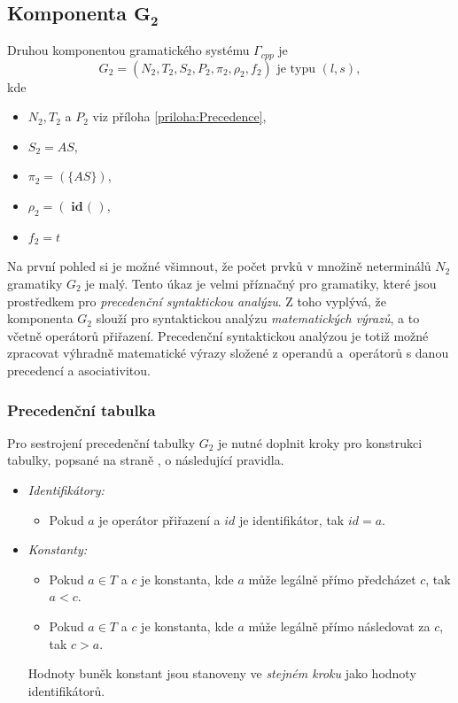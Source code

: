 \subsection*{Komponenta $\textbf{G}_\textbf{2}$}
Druhou komponentou gramatického systému $\Gamma_{cpp}$ je
$$G_2 = (N_2, T_2, S_2, P_2, \pi_2, \rho_2, f_2)\text{ je typu } (l, s),$$ kde
\begin{itemize}
  \item $N_2, T_2$ a $P_2$ viz příloha \ref{priloha:Precedence},
  \item $S_2 = AS$,
  \item $\pi_2 = (\{AS\})$,
  \item $\rho_2 = (\textbf{ id} \textbf{ ( })$,
  \item $f_2 = t$
\end{itemize}
Na první pohled si je možné všimnout, že počet prvků v množině neterminálů $N_2$ gramatiky $G_2$ je malý. Tento úkaz je velmi příznačný
pro gramatiky, které jsou prostředkem pro \emph{precedenční syntaktickou analýzu}. Z toho vyplývá, že komponenta $G_2$ slouží pro syntaktickou analýzu \emph{matematických výrazů}, a to
včetně operátorů přiřazení. Precedenční syntaktickou analýzou je totiž možné zpracovat výhradně matematické výrazy složené z operandů a~operátorů s danou precedencí a asociativitou.

\subsubsection{Precedenční tabulka}
Pro sestrojení precedenční tabulky $G_2$ je nutné doplnit kroky pro konstrukci tabulky, popsané
na straně \pageref{nadpisKonstrukcePrecTabulky}, o následující pravidla.

\begin{itemize}
  \item \emph{Identifikátory:}
    \begin{itemize}
      \item Pokud $a$ je operátor přiřazení a $id$ je identifikátor, tak $id = a$.
    \end{itemize}
  \item \emph{Konstanty:}
    \begin{itemize}
      \item Pokud $a \in T$ a $c$ je konstanta, kde $a$ může legálně přímo předcházet $c$, tak $a < c$.
      \item Pokud $a \in T$ a $c$ je konstanta, kde $a$ může legálně přímo následovat za $c$, tak $c > a$.
    \end{itemize}
    Hodnoty buněk konstant jsou stanoveny ve \emph{stejném kroku} jako hodnoty identifikátorů.
\end{itemize}

